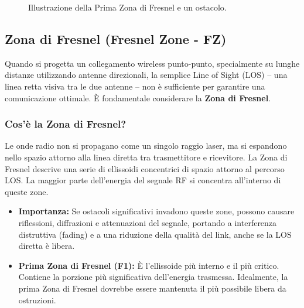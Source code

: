 \begin{figure}[H]
    \caption{Illustrazione della Prima Zona di Fresnel e un ostacolo.}
\end{figure}

\subsection{Zona di Fresnel (Fresnel Zone - FZ)}
Quando si progetta un collegamento wireless punto-punto, specialmente su lunghe distanze utilizzando antenne direzionali, la semplice Line of Sight (LOS) -- una linea retta visiva tra le due antenne -- non è sufficiente per garantire una comunicazione ottimale. È fondamentale considerare la \textbf{Zona di Fresnel}.

\subsubsection{Cos'è la Zona di Fresnel?}
Le onde radio non si propagano come un singolo raggio laser, ma si espandono nello spazio attorno alla linea diretta tra trasmettitore e ricevitore. La Zona di Fresnel descrive una serie di ellissoidi concentrici di spazio attorno al percorso LOS. La maggior parte dell'energia del segnale RF si concentra all'interno di queste zone.

\begin{itemize}
    \item \textbf{Importanza:} Se ostacoli significativi invadono queste zone, possono causare riflessioni, diffrazioni e attenuazioni del segnale, portando a interferenza distruttiva (fading) e a una riduzione della qualità del link, anche se la LOS diretta è libera.
    \item \textbf{Prima Zona di Fresnel (F1):} È l'ellissoide più interno e il più critico. Contiene la porzione più significativa dell'energia trasmessa. Idealmente, la prima Zona di Fresnel dovrebbe essere mantenuta il più possibile libera da ostruzioni.
\end{itemize}

